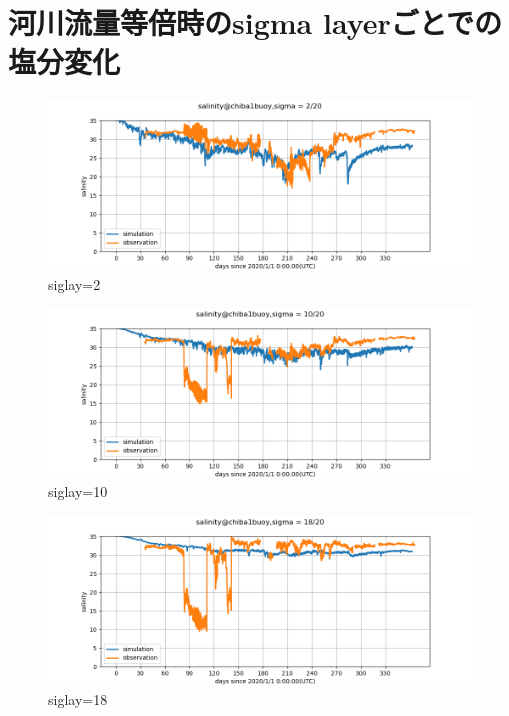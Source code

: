 \documentclass[12pt,a4paper]{jarticle}
\begin{document}
\newpage
\section{河川流量等倍時のsigma layerごとでの塩分変化}
\begin{figure}[hbtp]
    \centering
        \includegraphics[keepaspectratio,scale=0.5]{Tokyo4/salinity_chiba1buoy_2_Tokyo4.png}
    \caption{siglay=2}
\end{figure}

\begin{figure}[hbtp]
    \centering
        \includegraphics[keepaspectratio,scale=0.5]{Tokyo4/salinity_chiba1buoy_10_Tokyo4.png}
    \caption{siglay=10}
\end{figure}

\begin{figure}[hbtp]
    \centering
        \includegraphics[keepaspectratio,scale=0.5]{Tokyo4/salinity_chiba1buoy_18_Tokyo4.png}
    \caption{siglay=18}
\end{figure}
\end{document}
